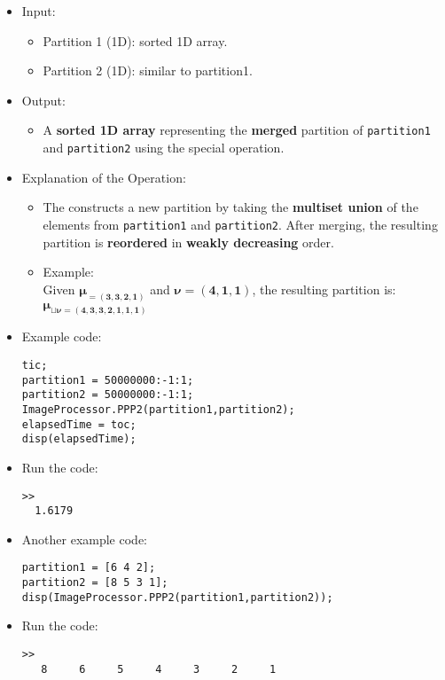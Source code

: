 \documentclass[11pt]{amsart}
\theoremstyle{remark}
\providecommand{\tightlist}{%
  \setlength{\itemsep}{0pt}\setlength{\parskip}{0pt}}
\theoremstyle{definition}
\theoremstyle{remark}
\numberwithin{equation}{section}
\begin{document}
\begin{itemize}
\item
  Input:

  \begin{itemize}
  \tightlist
  \item
    Partition 1 (1D): sorted 1D array.\\
  \item
    Partition 2 (1D): similar to partition1.\\
  \end{itemize}
\item
  Output:

  \begin{itemize}
  \tightlist
  \item
    A \textbf{sorted 1D array} representing the \textbf{merged}
    partition of \texttt{partition1} and \texttt{partition2} using the
    special operation.
  \end{itemize}
\item
  Explanation of the Operation:

  \begin{itemize}
  \tightlist
  \item
    The constructs a new partition by taking the
    \textbf{multiset union} of the elements from \texttt{partition1} and
    \texttt{partition2}. After merging, the resulting partition is
    \textbf{reordered} in \textbf{weakly decreasing} order.
  \item
    Example:\\
    Given $\boldsymbol{\mu_{ = (3,3,2,1)}}$ and $\boldsymbol{\nu = (4,1,1)}$, the resulting
    partition is: $\boldsymbol{\mu_{ \sqcup \nu = (4,3,3,2,1,1,1)}}$\\
  \end{itemize}
\item
  Example code:

\begin{verbatim}
tic;
partition1 = 50000000:-1:1;
partition2 = 50000000:-1:1;
ImageProcessor.PPP2(partition1,partition2);
elapsedTime = toc;
disp(elapsedTime);
\end{verbatim}
\item
  Run the code:

\begin{verbatim}
>> 
  1.6179
\end{verbatim}
\item
  Another example code:

\begin{verbatim}
partition1 = [6 4 2];
partition2 = [8 5 3 1];
disp(ImageProcessor.PPP2(partition1,partition2));
\end{verbatim}
\item
  Run the code:

\begin{verbatim}
>> 
   8     6     5     4     3     2     1
\end{verbatim}
\end{itemize}
\end{document}
